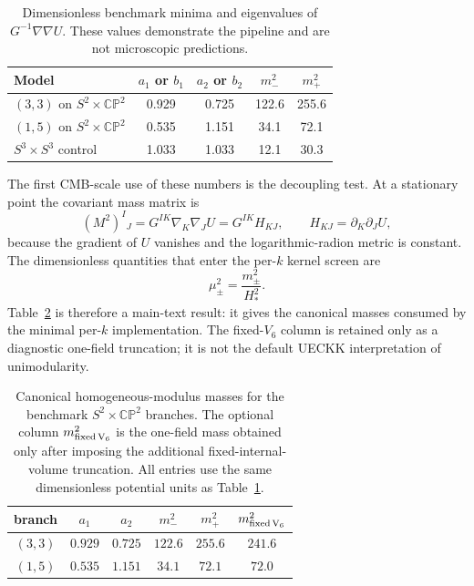 \documentclass[aps,prd,twocolumn,superscriptaddress,nofootinbib,longbibliography,floatfix]{revtex4-2}
\newcommand{\CP}{\mathbb{CP}}
\begin{document}
\begin{table}[tbp]
\caption{Dimensionless benchmark minima and eigenvalues of $G^{-1}\nabla\nabla U$. These values demonstrate the pipeline and are not microscopic predictions.}
\label{tab:benchmarknumbers}
\begin{ruledtabular}
\begin{tabular}{lcccc}
Model & $a_1$ or $b_1$ & $a_2$ or $b_2$ & $m_-^2$ & $m_+^2$\\
\hline
$(3,3)$ on $S^2\times\CP^2$ & 0.929 & 0.725 & 122.6 & 255.6\\
$(1,5)$ on $S^2\times\CP^2$ & 0.535 & 1.151 & 34.1 & 72.1\\
$S^3\times S^3$ control & 1.033 & 1.033 & 12.1 & 30.3\\
\end{tabular}
\end{ruledtabular}
\end{table}

The first CMB-scale use of these numbers is the decoupling test. At a stationary point the covariant mass matrix is
\begin{equation}
(M^2)^I{}_{J}=G^{IK}\nabla_K\nabla_JU=G^{IK}H_{KJ},
\qquad H_{KJ}=\partial_K\partial_JU,
\label{eq:maincanonicalmass}
\end{equation}
because the gradient of $U$ vanishes and the logarithmic-radion metric is constant. The dimensionless quantities that enter the per-$k$ kernel screen are
\begin{equation}
\mu_\pm^2=\frac{m_\pm^2}{H_*^2}.
\label{eq:mainmuratios}
\end{equation}
Table~\ref{tab:canonicalmasses} is therefore a main-text result: it gives the canonical masses consumed by the minimal per-$k$ implementation. The fixed-$V_6$ column is retained only as a diagnostic one-field truncation; it is not the default UECKK interpretation of unimodularity.

\begin{table}[tbp]
\caption{Canonical homogeneous-modulus masses for the benchmark $S^2\times\CP^2$ branches. The optional column $m_{\rm fixed\,V_6}^2$ is the one-field mass obtained only after imposing the additional fixed-internal-volume truncation. All entries use the same dimensionless potential units as Table~\ref{tab:benchmarknumbers}.}
\label{tab:canonicalmasses}
\begin{ruledtabular}
\begin{tabular}{c c c c c c}
branch & $a_1$ & $a_2$ & $m_-^2$ & $m_+^2$ & $m_{\rm fixed\,V_6}^2$\\
\hline
$(3,3)$ & $0.929$ & $0.725$ & $122.6$ & $255.6$ & $241.6$\\
$(1,5)$ & $0.535$ & $1.151$ & $34.1$ & $72.1$ & $72.0$
\end{tabular}
\end{ruledtabular}
\end{table}
\end{document}
